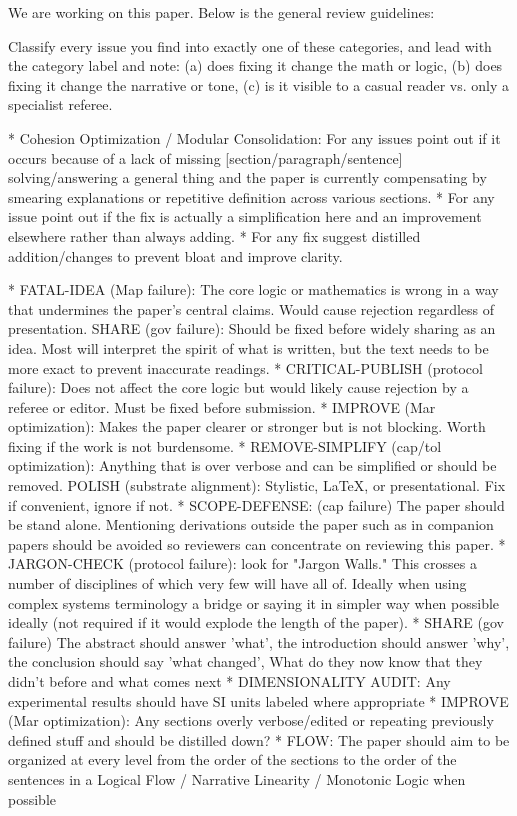 We are working on this paper.  Below is the general review guidelines:

Classify every issue you find into exactly one of these categories, and lead with the category label and note: (a) does fixing it change the math or logic, (b) does fixing it change the narrative or tone, (c) is it visible to a casual reader vs. only a specialist referee.

* Cohesion Optimization / Modular Consolidation: For any issues point out if it occurs because of a lack of missing [section/paragraph/sentence] solving/answering a general thing and the paper is currently compensating by smearing explanations or repetitive definition across various sections.
* For any issue point out if the fix is actually a simplification here and an improvement elsewhere rather than always adding.
* For any fix suggest distilled addition/changes to prevent bloat and improve clarity.

* FATAL-IDEA (Map failure): The core logic or mathematics is wrong in a way that undermines the paper's central claims. Would cause rejection regardless of presentation.
SHARE (gov failure): Should be fixed before widely sharing as an idea.  Most will interpret the spirit of what is written, but the text needs to be more exact to prevent inaccurate readings.
* CRITICAL-PUBLISH (protocol failure): Does not affect the core logic but would likely cause rejection by a referee or editor. Must be fixed before submission.
* IMPROVE (Mar optimization): Makes the paper clearer or stronger but is not blocking. Worth fixing if the work is not burdensome.
* REMOVE-SIMPLIFY (cap/tol optimization): Anything that is over verbose and can be simplified or should be removed.
POLISH (substrate alignment): Stylistic, LaTeX, or presentational. Fix if convenient, ignore if not.
* SCOPE-DEFENSE: (cap failure) The paper should be stand alone.  Mentioning derivations outside the paper such as in companion papers should be avoided so reviewers can concentrate on reviewing this paper.
* JARGON-CHECK (protocol failure): look for "Jargon Walls." This crosses a number of disciplines of which very few will have all of.  Ideally when using complex systems terminology a bridge or saying it in simpler way when possible ideally (not required if it would explode the length of the paper).
* SHARE (gov failure) The abstract should answer 'what', the introduction should answer 'why', the conclusion should say 'what changed', What do they now know that they didn't before and what comes next
* DIMENSIONALITY AUDIT: Any experimental results should have SI units labeled where appropriate
* IMPROVE (Mar optimization): Any sections overly verbose/edited or repeating previously defined stuff and should be distilled down?
* FLOW: The paper should aim to be organized at every level from the order of the sections to the order of the sentences in a Logical Flow / Narrative Linearity / Monotonic Logic when possible

